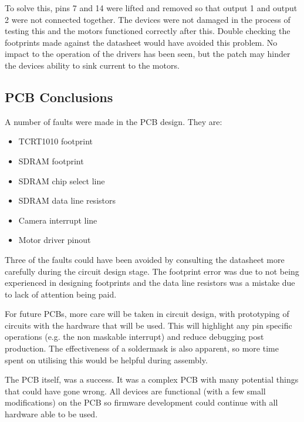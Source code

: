To solve this, pins 7 and 14 were lifted and removed so that output 1 and output 2 were not connected together. The devices were not damaged in the process of testing this and the motors functioned correctly after this. Double checking the footprints made against the datasheet would have avoided this problem. No impact to the operation of the drivers has been seen, but the patch may hinder the devices ability to sink current to the motors. 

\subsection{PCB Conclusions}
A number of faults were made in the PCB design. They are:
\begin{itemize}
\item TCRT1010 footprint
\item SDRAM footprint
\item SDRAM chip select line
\item SDRAM data line resistors
\item Camera interrupt line
\item Motor driver pinout
\end{itemize}
Three of the faults could have been avoided by consulting the datasheet more carefully during the circuit design stage. The footprint error was due to not being experienced in designing footprints and the data line resistors was a mistake due to lack of attention being paid. 

For future PCBs, more care will be taken in circuit design, with prototyping of circuits with the hardware that will be used. This will highlight any pin specific operations (e.g. the non maskable interrupt) and reduce debugging post production. The effectiveness of a soldermask is also apparent, so more time spent on utilising this would be helpful during assembly.

The PCB itself, was a success. It was a complex PCB with many potential things that could have gone wrong. All devices are functional (with a few small modifications) on the PCB so firmware development could continue with all hardware able to be used.

